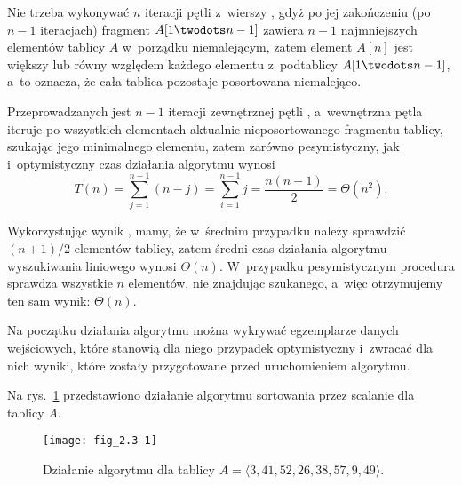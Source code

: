 Nie trzeba wykonywać $n$ iteracji pętli  z~wierszy \doubledash{\ref{li:selection-sort-for-begin}}{\ref{li:selection-sort-for-end}}, gdyż po jej zakończeniu (po $n-1$ iteracjach) fragment $A[1\twodots n-1]$ zawiera $n-1$ najmniejszych elementów tablicy $A$ w~porządku niemalejącym, zatem element $A[n]$ jest większy lub równy względem każdego elementu z~podtablicy $A[1\twodots n-1]$, a~to oznacza, że cała tablica pozostaje posortowana niemalejąco.

Przeprowadzanych jest $n-1$ iteracji zewnętrznej pętli , a~wewnętrzna pętla  iteruje po wszystkich elementach aktualnie nieposortowanego fragmentu tablicy, szukając jego minimalnego elementu, zatem zarówno pesymistyczny, jak i~optymistyczny czas działania algorytmu wynosi
\[
	T(n) = \sum_{j=1}^{n-1}(n-j) = \sum_{i=1}^{n-1}j = \frac{n(n-1)}{2} = \Theta(n^2).
\]

\exercise %
Wykorzystując wynik , mamy, że w~średnim przypadku należy sprawdzić $(n+1)/2$ elementów tablicy, zatem średni czas działania algorytmu wyszukiwania liniowego wynosi $\Theta(n)$. W~przypadku pesymistycznym procedura sprawdza wszystkie $n$ elementów, nie znajdując szukanego, a~więc otrzymujemy ten sam wynik: $\Theta(n)$.

\exercise %
Na początku działania algorytmu można wykrywać egzemplarze danych wejściowych, które stanowią dla niego przypadek optymistyczny i~zwracać dla nich wyniki, które zostały przygotowane przed uruchomieniem algorytmu.


\exercise %
Na rys.~\ref{fig:2.3-1} przedstawiono działanie algorytmu sortowania przez scalanie dla tablicy $A$.
\begin{figure}[ht]
	\begin{center}
		\texttt{[image: fig\_2.3-1]}
	\end{center}
	\caption{Działanie algorytmu  dla tablicy $A=\langle3,41,52,26,38,57,9,49\rangle$.} \label{fig:2.3-1}
\end{figure}

